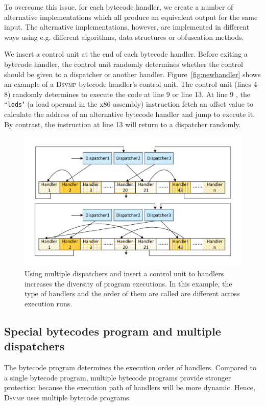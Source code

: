 \documentclass[preprint,12pt,3p]{elsarticle}
\newcommand{\DSVMP}{\textsc{Dsvmp}\xspace}
\begin{document}
To overcome this issue, for each bytecode handler, we create a number of alternative implementations which all
produce an equivalent output for the same input. The alternative implementations, however,
are implemented in different ways using e.g. different algorithms, data structures or obfuscation methods.

We insert a control unit at the end of each bytecode handler. Before exiting a bytecode handler,
the control unit randomly determines whether the control should be given to a dispatcher or
another handler. Figure~\ref{fig:newhandler} shows an example of a \DSVMP bytecode handler's control unit.
The control unit (lines 4-8) randomly determines to execute the code at line 9 or line 13.
At line 9 , the ``\texttt{lods}" (a load operand in the x86 assembly) instruction fetch an offset value
to calculate the address of an alternative bytecode handler and jump to execute it.
By contrast, the instruction at line 13 will return to a dispatcher randomly.

\begin{figure}[!t]
  \centering
  \includegraphics[width=0.65\columnwidth]{figure/figdh.pdf}
  \caption{Using multiple dispatchers and insert a control unit to handlers increases the diversity of program executions. In this example, the type of handlers and the order of them are called are different across execution runs. }\label{fig:Fig.dh}
\end{figure}

\subsection{Special bytecodes program and multiple dispatchers}\label{sec:mbd}
The bytecode program determines the execution order of handlers. Compared to a single bytecode program,
multiple bytecode programs provide stronger protection because the execution path of handlers will be more dynamic.
Hence, \DSVMP uses multiple bytecode programs.
\end{document}
